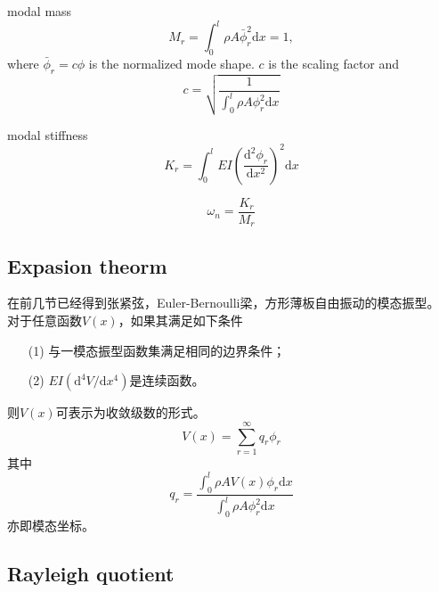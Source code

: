 modal mass
\begin{equation}\label{eq-1::model-mass}
    M_{r}=\int_{0}^{l}\rho A\bar{\phi}_{r}^{2}\mathrm{d}x=1,
\end{equation}
where $\bar{\phi}_{r}=c\phi$ is the normalized mode shape. $c$ is the scaling factor and 
\begin{equation}
    c=\sqrt{\frac{1}{\int_{0}^{l}\rho A\phi_{r}^{2}\mathrm{d}x}}
\end{equation}

modal stiffness
\begin{equation}\label{eq-1::modal-stiffness}
    K_{r}=\int_{0}^{l}EI\left(\frac{\mathrm{d}^{2}\phi_{r}}{\mathrm{d}x^{2}}\right)^{2}\mathrm{d}x
\end{equation}

\begin{equation}\label{eq-1::relation-mass-stiffness}
    \omega_{n}=\frac{K_{r}}{M_{r}}
\end{equation}

\subsection{Expasion theorm}

在前几节已经得到张紧弦，Euler-Bernoulli梁，方形薄板自由振动的模态振型。
对于任意函数$V(x)$，如果其满足如下条件
\begin{enumerate}
    \item[(1)] 与一模态振型函数集满足相同的边界条件；
    \item[(2)] $EI\left(\mathrm{d}^{4}V/\mathrm{d}x^{4}\right)$是连续函数。
\end{enumerate}
则$V(x)$可表示为收敛级数的形式。
\begin{equation}\label{eq-1::expansion}
    V(x)=\sum_{r=1}^{\infty}q_{r}\phi_{r}
\end{equation}
其中
\begin{equation}
    q_{r}=\frac{\int_{0}^{l}\rho AV(x)\phi_{r}\mathrm{d}x}{\int_{0}^{l}\rho A\phi_{r}^{2}\mathrm{d}x}
\end{equation}
亦即模态坐标。

\subsection{Rayleigh quotient}

